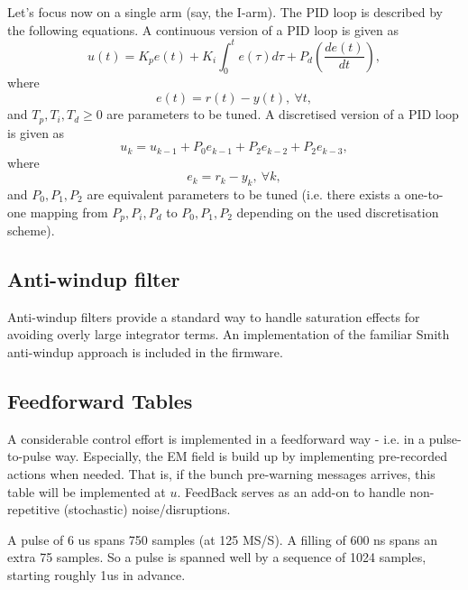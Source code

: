\documentclass[12pt]{amsart}
\begin{document}
Let's focus now on a single arm (say, the I-arm).
The PID loop is described by the following equations.
A continuous version of a PID loop is given as 
\begin{equation}
	u(t) = K_p e(t) + K_i \int_0^t e(\tau) d\tau + P_d \left(\dfrac{de(t)}{dt}\right),
	\label{eq:piBC}
\end{equation}
where 
\begin{equation}
	e(t) = r(t) - y(t), \ \forall t,
	\label{eq:piBCe}
\end{equation}
and $T_p,T_i,T_d\geq 0$ are parameters to be tuned. 
A discretised version of a PID loop is given as 
\begin{equation}
	u_k = u_{k-1} + P_0 e_{k-1} + P_2 e_{k-2} + P_2 e_{k-3},
	\label{eq:pid}
\end{equation}
where 
\begin{equation}
	e_k = r_k - y_k, \ \forall k,
	\label{eq:pid}
\end{equation}
and $P_0, P_1, P_2$ are equivalent parameters to be tuned 
(i.e. there exists a one-to-one mapping from $P_p, P_i, P_d$ to $P_0, P_1, P_2$
depending on the used discretisation scheme).

\subsection{Anti-windup filter}

Anti-windup filters provide a standard way to handle saturation effects for avoiding overly large integrator terms.
An implementation of the familiar Smith anti-windup approach is included in the firmware.

%

\subsection{Feedforward Tables}

A considerable control effort is implemented in a feedforward way - i.e. in a pulse-to-pulse way.
Especially, the EM field is build up by implementing pre-recorded actions when needed.
That is, if the bunch pre-warning messages arrives,  this table will be implemented at $u$.
FeedBack serves as an add-on to handle non-repetitive (stochastic) noise/disruptions.

A pulse of 6 us spans 750 samples (at 125 MS/S).
A filling of 600 ns spans an extra 75 samples.
So a pulse is spanned well by a sequence of 1024 samples, starting roughly 1us in advance.
 
\end{document}
